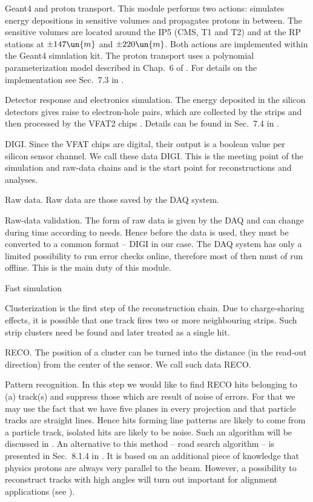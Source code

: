 \> Geant4 and proton transport.
This module performs two actions: simulates energy depositions in sensitive volumes and propagates protons in between. The sensitive volumes are located around the IP5 (CMS, T1 and T2) and at the RP stations at $\pm 147\un{m}$ and $\pm 220\un{m}$. Both actions are implemented within the Geant4  simulation kit. The proton transport uses a polynomial parameterization model described in Chap.~6 of . For details on the implementation see Sec.~7.3 in .

\> Detector response and electronics simulation.
The energy deposited in the silicon detectors gives raise to electron-hole pairs, which are collected by the strips and then processed by the VFAT2 chips . Details can be found in Sec.~7.4 in .

\> DIGI.
Since the VFAT chips are digital, their output is a boolean value per silicon sensor channel. We call these data DIGI. This is the meeting point of the simulation and raw-data chains and is the start point for reconstructions and analyses.

\> Raw data.
Raw data are those saved by the DAQ system.

\> Raw-data validation.
The form of raw data is given by the DAQ and can change during time according to needs. Hence before the data is used, they must be converted to a common format -- DIGI in our case. The DAQ system has only a limited possibility to run error checks online, therefore most of then must of run offline. This is the main duty of this module.

\> Fast simulation


\> Clusterization
is the first step of the reconstruction chain. Due to charge-sharing effects, it is possible that one track fires two or more neighbouring strips. Such strip clusters need be found and later treated as a single hit.

\> RECO.
The position of a cluster can be turned into the distance (in the read-out direction) from the center of the sensor. We call such data RECO.


\> Pattern recognition.
In this step we would like to find RECO hits belonging to (a) track(s) and suppress those which are result of noise of errors. For that we may use the fact that we have five planes in every projection and that particle tracks are straight lines. Hence hits forming line patterns are likely to come from a particle track, isolated hits are likely to be noise. Such an algorithm will be discussed in . An alternative to this method -- road search algorithm -- is presented in Sec.~8.1.4 in . It is based on an additional piece of knowledge that physics protons are always very parallel to the beam. However, a possibility to reconstruct tracks with high angles will turn out important for alignment applications (see ). 

